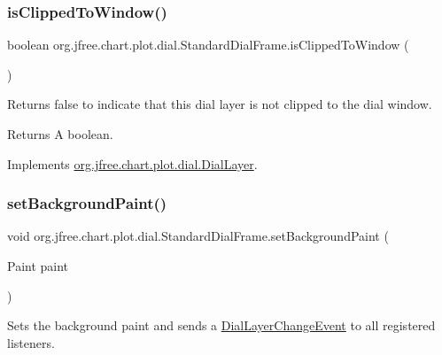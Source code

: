 \subsubsection{\texorpdfstring{is\+Clipped\+To\+Window()}{isClippedToWindow()}}
{\footnotesize\ttfamily boolean org.\+jfree.\+chart.\+plot.\+dial.\+Standard\+Dial\+Frame.\+is\+Clipped\+To\+Window (\begin{DoxyParamCaption}{ }\end{DoxyParamCaption})}

Returns {\ttfamily false} to indicate that this dial layer is not clipped to the dial window.

\begin{DoxyReturn}{Returns}
A boolean. 
\end{DoxyReturn}


Implements \mbox{\hyperlink{interfaceorg_1_1jfree_1_1chart_1_1plot_1_1dial_1_1_dial_layer_a822eeadbe31b48827497714abeda2190}{org.\+jfree.\+chart.\+plot.\+dial.\+Dial\+Layer}}.

\mbox{\label{classorg_1_1jfree_1_1chart_1_1plot_1_1dial_1_1_standard_dial_frame_a3b3dce37f8a677dad3aa432c862a4c11}} 
\subsubsection{\texorpdfstring{set\+Background\+Paint()}{setBackgroundPaint()}}
{\footnotesize\ttfamily void org.\+jfree.\+chart.\+plot.\+dial.\+Standard\+Dial\+Frame.\+set\+Background\+Paint (\begin{DoxyParamCaption}\item[{Paint}]{paint }\end{DoxyParamCaption})}

Sets the background paint and sends a \mbox{\hyperlink{classorg_1_1jfree_1_1chart_1_1plot_1_1dial_1_1_dial_layer_change_event}{Dial\+Layer\+Change\+Event}} to all registered listeners.


